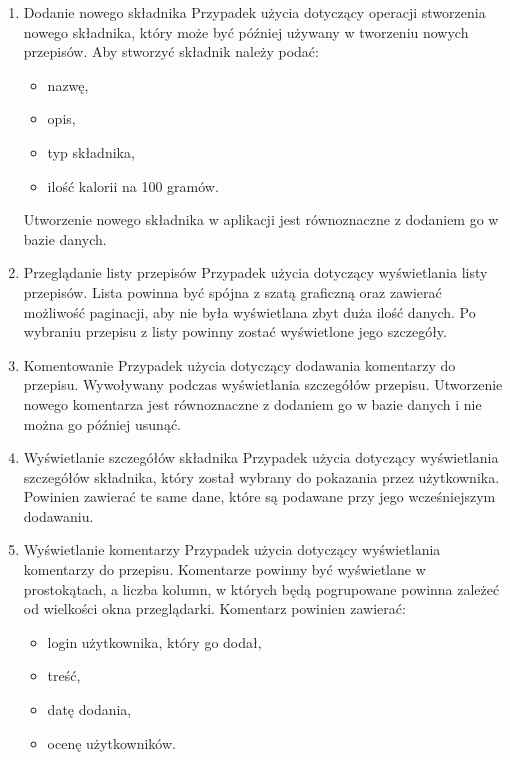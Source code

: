 \begin{enumerate}
    \item Dodanie nowego składnika\newline
    Przypadek użycia dotyczący operacji stworzenia nowego składnika, który może być później używany w tworzeniu nowych przepisów. Aby stworzyć składnik należy podać:
    \begin{itemize}
        \item nazwę,
        \item opis,
        \item typ składnika,
        \item ilość kalorii na 100 gramów.
    \end{itemize}
    Utworzenie nowego składnika w aplikacji jest równoznaczne z dodaniem go w bazie danych.
    
    \item Przeglądanie listy przepisów\newline
    Przypadek użycia dotyczący wyświetlania listy przepisów. Lista powinna być spójna z szatą graficzną oraz zawierać możliwość paginacji, aby nie była wyświetlana zbyt duża ilość danych. Po wybraniu przepisu z listy powinny zostać wyświetlone jego szczegóły.
    
    \item Komentowanie\newline
    Przypadek użycia dotyczący dodawania komentarzy do przepisu. Wywoływany podczas wyświetlania szczegółów przepisu. Utworzenie nowego komentarza jest równoznaczne z dodaniem go w bazie danych i nie można go później usunąć.
    
    \item Wyświetlanie szczegółów składnika\newline
    Przypadek użycia dotyczący wyświetlania szczegółów składnika, który został wybrany do pokazania przez użytkownika. Powinien zawierać te same dane, które są podawane przy jego wcześniejszym dodawaniu.
    
    \item Wyświetlanie komentarzy\newline
    Przypadek użycia dotyczący wyświetlania komentarzy do przepisu. Komentarze powinny być wyświetlane w prostokątach, a liczba kolumn, w których będą pogrupowane powinna zależeć od wielkości okna przeglądarki. Komentarz powinien zawierać: 
    \begin{itemize}
        \item login użytkownika, który go dodał,
        \item treść,
        \item datę dodania,
        \item ocenę użytkowników.
    \end{itemize}
    

\end{enumerate}
